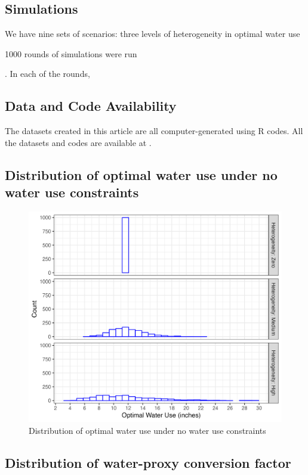 \documentclass[
]{article}
\begin{document}
\subsection{Simulations}\label{simulations}

We have nine sets of scenarios: three levels of heterogeneity in optimal water use

1000 rounds of simulations were run

. In each of the rounds,

\subsection{Data and Code Availability}\label{data-and-code-availability}

The datasets created in this article are all computer-generated using R codes. All the datasets and codes are available at .

\clearpage

\appendix


\subsection{Distribution of optimal water use under no water use constraints}\label{distribution-of-optimal-water-use-under-no-water-use-constraints}

\begin{figure}[H]

{\centering \includegraphics{figures/g_opt_w_dist} 

}

\caption{Distribution of optimal water use under no water use constraints}\label{fig:dist-opt-w}
\end{figure}

\subsection{Distribution of water-proxy conversion factor}\label{distribution-of-water-proxy-conversion-factor}

\clearpage

  
\end{document}
